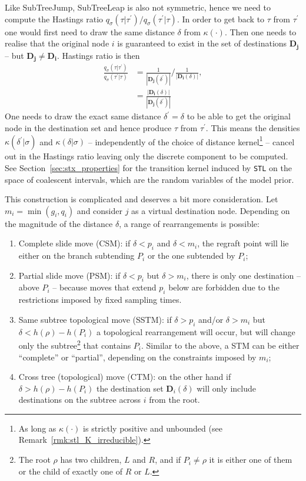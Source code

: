 Like SubTreeJump, SubTreeLeap is also not symmetric, hence we need to compute the Hastings ratio $q_{\sigma}(\tau|\tau^\prime)/q_{\sigma}(\tau^\prime|\tau)$.
In order to get back to $\tau$ from $\tau^\prime$ one would first need to draw the same distance $\delta$ from $\kappa(\cdot)$. 
Then one needs to realise that the original node $i$ is guaranteed to exist in the set of destinations $\mathbf{D_j}$ -- but $\mathbf{D_j} \neq \mathbf{D_i}$.
Hastings ratio is then 
\begin{align}
 \frac{q_{\sigma}(\tau|\tau^\prime)}{q_{\sigma}(\tau^\prime|\tau)} & = \frac{1}{|\mathbf{D_j}(\delta^\prime)|}/\frac{1}{|\mathbf{D_i}(\delta)|},  \\ \nonumber
 & = \frac{|\mathbf{D_i}(\delta)|}{|\mathbf{D_j}(\delta^\prime)|}
\end{align}
One needs to draw the exact same distance $\delta^\prime = \delta$ to be able to get the original node in the destination set and hence produce $\tau$ from $\tau^\prime$.
This means the densities $\kappa(\delta^\prime | \sigma)$ and $\kappa(\delta| \sigma)$ -- independently of the choice of distance kernel\footnote{As long as $\kappa(\cdot)$ is strictly positive and unbounded (see Remark~\ref{rmk:stl_K_irreducible}).} --  cancel out in the Hastings ratio leaving only the discrete component to be computed.
See Section~\ref{sec:stx_properties} for the transition kernel induced by \verb|STL| on the space of coalescent intervals, which are the random variables of the model prior.

This construction is complicated and deserves a bit more consideration.
Let $m_i = \min(g_i, q_i)$ and consider $j$ as a virtual destination node.
Depending on the magnitude of the distance $\delta$, a range of rearrangements is possible:

\begin{enumerate}[label=\Alph*)]
 \item Complete slide move (CSM): if $\delta < p_i$ and $\delta < m_i$, the regraft point will lie either on the branch subtending $P_i$ or the one subtended by $P_i$;
 \item Partial slide move (PSM): if $\delta < p_i$ but $\delta > m_i$, there is only one destination -- above $P_i$ -- because moves that extend $p_i$ below are forbidden due to the restrictions imposed by fixed sampling times.
 \item Same subtree topological move (SSTM): if $\delta > p_i$ and/or $\delta > m_i$ but $\delta < h(\rho)-h(P_i)$ a topological rearrangement will occur, but will change only the subtree\footnote{The root $\rho$ has two children, $L$ and $R$, and if $P_i \neq \rho$ it is either one of them or the child of exactly one of $R$ or $L$.} that contains $P_i$.
 Similar to the above, a STM can be either ``complete'' or ``partial'', depending on the constraints imposed by $m_i$;
 \item Cross tree (topological) move (CTM): on the other hand if $\delta > h(\rho)-h(P_i)$ the destination set $\boldsymbol D_i(\delta)$ will only include destinations on the subtree across $i$ from the root.
 \end{enumerate}

